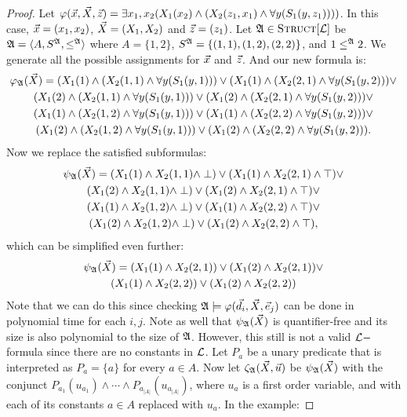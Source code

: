 \begin{proof}
Let $\varphi(\vec{x},\vec{X},\vec{z}) = \exists x_1,x_2( X_1(x_2) \wedge ( X_2(z_1,x_1) \wedge \forall y( S_1(y,z_1) )  ))$. In this case, $\vec{x} = (x_1,x_2)$, $\vec{X} = (X_1,X_2)$ and $\vec{z} = (z_1)$. Let ${\frak A}\in\textsc{Struct}[{\cal L}]$ be ${\frak A} = \langle A,S^{\frak A},\leq^{\frak A} \rangle$ where $A = \{1,2\}$, $S^{\frak A} = \{(1,1),(1,2),(2,2)\}$, and $1 \leq^{\frak A} 2$. We generate all the possible assignments for $\vec{x}$ and $\vec{z}$. And our new formula is:
\begin{multline*}
\varphi_{\frak A}(\vec{X}) = (X_1(1) \wedge ( X_2(1,1) \wedge \forall y( S_1(y,1) )  ) \vee (X_1(1) \wedge ( X_2(2,1) \wedge \forall y( S_1(y,2) )  ) \vee \\
(X_1(2) \wedge ( X_2(1,1) \wedge \forall y( S_1(y,1) )  ) \vee (X_1(2) \wedge ( X_2(2,1) \wedge \forall y( S_1(y,2) )  ) \vee \\
(X_1(1) \wedge ( X_2(1,2) \wedge \forall y( S_1(y,1) )  ) \vee (X_1(1) \wedge ( X_2(2,2) \wedge \forall y( S_1(y,2) )  ) \vee \\
(X_1(2) \wedge ( X_2(1,2) \wedge \forall y( S_1(y,1) )  ) \vee (X_1(2) \wedge ( X_2(2,2) \wedge \forall y( S_1(y,2) )  ).
\end{multline*}
Now we replace the satisfied subformulas:
\begin{multline*}
\psi_{\frak A}(\vec{X}) = (X_1(1) \wedge X_2(1,1) \wedge \perp  ) \vee (X_1(1) \wedge  X_2(2,1) \wedge \top  ) \vee \\
(X_1(2) \wedge  X_2(1,1) \wedge \perp  ) \vee (X_1(2) \wedge  X_2(2,1) \wedge \top  ) \vee \\
(X_1(1) \wedge  X_2(1,2) \wedge \perp  ) \vee (X_1(1) \wedge  X_2(2,2) \wedge \top  ) \vee \\
(X_1(2) \wedge  X_2(1,2) \wedge \perp  ) \vee (X_1(2) \wedge  X_2(2,2) \wedge \top  ),
\end{multline*}
which can be simplified even further:
\begin{multline*}
\psi_{\frak A}(\vec{X}) = (X_1(1) \wedge X_2(2,1)  ) \vee (X_1(2) \wedge  X_2(2,1) ) \vee \\ (X_1(1) \wedge  X_2(2,2)  ) \vee (X_1(2) \wedge  X_2(2,2)  )
\end{multline*}
Note that we can do this since checking ${\frak A}\models\varphi(\vec{d}_i,\vec{X},\vec{e}_j)$ can be done in polynomial time for each $i,j$. Note as well that $\psi_{\frak A}(\vec{X})$ is quantifier-free and its size is also polynomial to the size of ${\frak A}$. However, this still is not a valid ${\cal L}-$formula since there are no constants in ${\cal L}$. Let $P_a$ be a unary predicate that is interpreted as $P_a = \{a\}$ for every $a\in A$. Now let $\zeta_{\frak A}(\vec{X},\vec{u})$ be $\psi_{\frak A}(\vec{X})$ with the conjunct $P_{a_1}(u_{a_1}) \wedge \cdots \wedge P_{a_{\vert A \vert}}(u_{a_{\vert A \vert}})$, where $u_a$ is a first order variable, and with each of its constants $a\in A$ replaced with $u_a$. In the example:

\end{proof}
